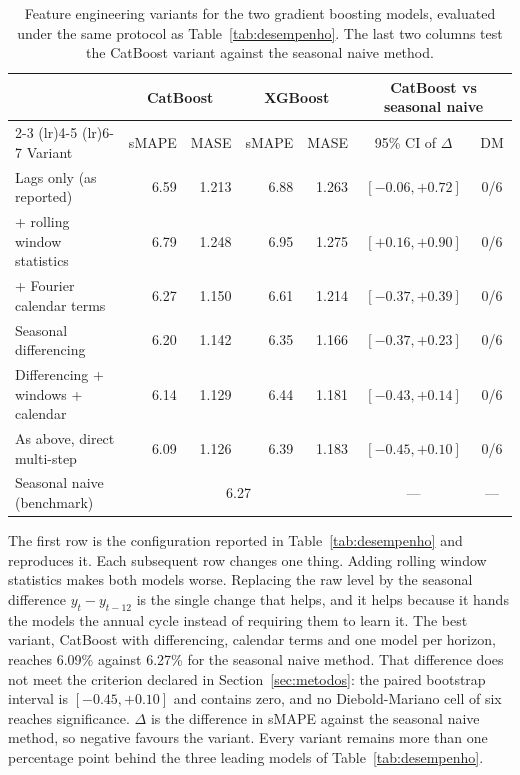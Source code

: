 \begin{table}[htbp]
\centering
\small
\setlength{\tabcolsep}{4pt}
\caption{Feature engineering variants for the two gradient boosting models, evaluated under
the same protocol as Table~\ref{tab:desempenho}. The last two columns test the CatBoost
variant against the seasonal naive method.}
\label{tab:variantes}
\begin{tabular}{lrrrrcc}
\toprule
& \multicolumn{2}{c}{CatBoost} & \multicolumn{2}{c}{XGBoost}
& \multicolumn{2}{c}{CatBoost vs seasonal naive} \\
\cmidrule(lr){2-3} \cmidrule(lr){4-5} \cmidrule(lr){6-7}
Variant & sMAPE & MASE & sMAPE & MASE & 95\% CI of $\Delta$ & DM \\
\midrule
Lags only (as reported) & 6.59 & 1.213 & 6.88 & 1.263 & $[-0.06, +0.72]$ & 0/6 \\
+ rolling window statistics & 6.79 & 1.248 & 6.95 & 1.275 & $[+0.16, +0.90]$ & 0/6 \\
+ Fourier calendar terms & 6.27 & 1.150 & 6.61 & 1.214 & $[-0.37, +0.39]$ & 0/6 \\
Seasonal differencing & 6.20 & 1.142 & 6.35 & 1.166 & $[-0.37, +0.23]$ & 0/6 \\
Differencing + windows + calendar & 6.14 & 1.129 & 6.44 & 1.181 & $[-0.43, +0.14]$ & 0/6 \\
As above, direct multi-step & 6.09 & 1.126 & 6.39 & 1.183 & $[-0.45, +0.10]$ & 0/6 \\
\midrule
Seasonal naive (benchmark) & \multicolumn{4}{c}{6.27 \quad 1.148} & --- & --- \\
\bottomrule
\end{tabular}

\vspace{0.5em}
\begin{minipage}{\textwidth}
\footnotesize
The first row is the configuration reported in Table~\ref{tab:desempenho} and reproduces it.
Each subsequent row changes one thing. Adding rolling window statistics makes both models
worse. Replacing the raw level by the seasonal difference $y_t - y_{t-12}$ is the single
change that helps, and it helps because it hands the models the annual cycle instead of
requiring them to learn it. The best variant, CatBoost with differencing, calendar terms and
one model per horizon, reaches 6.09\% against
6.27\% for the seasonal naive method. That difference does not meet the
criterion declared in Section~\ref{sec:metodos}: the paired bootstrap interval is
$[-0.45,
+0.10]$ and contains zero, and no
Diebold-Mariano cell of six reaches significance. $\Delta$ is the difference in sMAPE
against the seasonal naive method, so negative favours the variant. Every variant remains
more than one percentage point behind the three leading models of
Table~\ref{tab:desempenho}.
\end{minipage}
\end{table}